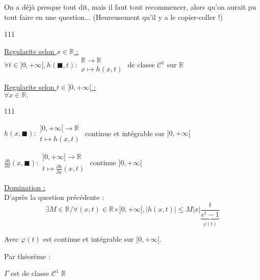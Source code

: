 On a déjà presque tout dit, mais il faut tout recommencer, alors qu'on aurait pu tout faire en une question... (Heureusement qu'il y a le copier-coller !)\\
\begin{dinglist}{111}
  \item \ul{Regularite selon $x\in\mathbb{R}$ :}\\
  $
    \forall t\in ]0, +\infty[, h(\blacksquare, t) :
    \begin{array}{l}
      \mathbb{R}\rightarrow\mathbb{R} \\
      x\mapsto h(x, t)
    \end{array}
  $
  de classe $\mathcal{C}^1$ sur $\mathbb{R}$
  \item \ul{Regularite selon $t\in]0, +\infty[$ :}\\
      $\forall x\in \mathbb{R},$
      \begin{dinglist}{111}
        \item
        $ h(x, \blacksquare) :
          \begin{array}{l}
            ]0, +\infty[\rightarrow\mathbb{R} \\
            t\mapsto h(x, t)
          \end{array}
        $ continue et intégrable sur $ ]0, +\infty[$
              \item
            $ \frac{\partial h}{\partial x}(x, \blacksquare) :
            \begin{array}{l}
              ]0, +\infty[\rightarrow\mathbb{R} \\
              t\mapsto \frac{\partial h}{\partial x}(x, t)
            \end{array}
            $ continue $ ]0, +\infty[$
      \end{dinglist}
      \item \ul{Domination :}\\
      D'après la question précédente :
      \[\exists M\in\mathbb{R} / \forall (x, t)\in \mathbb{R}\times]0, +\infty[, |h(x, t)| \leq M |x| \underbrace{\frac{t}{e^t-1}}_{\varphi(t)}\]

    Avec $\varphi(t)$ est continue et intégrable sur $[0, +\infty[$.
\end{dinglist}
Par théorème :
\begin{result}
  $\Gamma$ est de classe $\mathcal{C}^1$ $\mathbb{R}$
\end{result}
